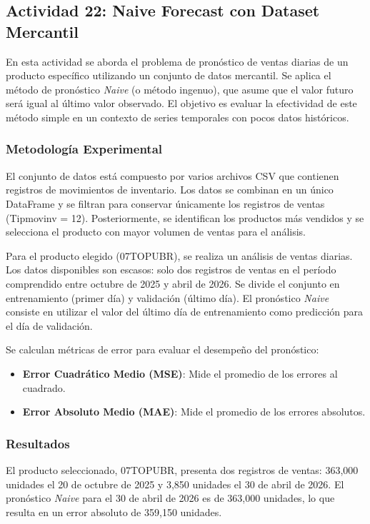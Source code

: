 \documentclass[12pt]{article}
\begin{document}
\subsection{Actividad 22: Naive Forecast con Dataset Mercantil}

En esta actividad se aborda el problema de pronóstico de ventas diarias de un producto específico utilizando un conjunto de datos mercantil. Se aplica el método de pronóstico \textit{Naive} (o método ingenuo), que asume que el valor futuro será igual al último valor observado. El objetivo es evaluar la efectividad de este método simple en un contexto de series temporales con pocos datos históricos.

\subsubsection*{Metodología Experimental}

El conjunto de datos está compuesto por varios archivos CSV que contienen registros de movimientos de inventario. Los datos se combinan en un único DataFrame y se filtran para conservar únicamente los registros de ventas (Tipmovinv = 12). Posteriormente, se identifican los productos más vendidos y se selecciona el producto con mayor volumen de ventas para el análisis.

Para el producto elegido (07TOPUBR), se realiza un análisis de ventas diarias. Los datos disponibles son escasos: solo dos registros de ventas en el período comprendido entre octubre de 2025 y abril de 2026. Se divide el conjunto en entrenamiento (primer día) y validación (último día). El pronóstico \textit{Naive} consiste en utilizar el valor del último día de entrenamiento como predicción para el día de validación.

Se calculan métricas de error para evaluar el desempeño del pronóstico:

\begin{itemize}
    \item \textbf{Error Cuadrático Medio (MSE)}: Mide el promedio de los errores al cuadrado.
    \item \textbf{Error Absoluto Medio (MAE)}: Mide el promedio de los errores absolutos.
\end{itemize}

\subsubsection*{Resultados}

El producto seleccionado, 07TOPUBR, presenta dos registros de ventas: 363,000 unidades el 20 de octubre de 2025 y 3,850 unidades el 30 de abril de 2026. El pronóstico \textit{Naive} para el 30 de abril de 2026 es de 363,000 unidades, lo que resulta en un error absoluto de 359,150 unidades.
\end{document}
